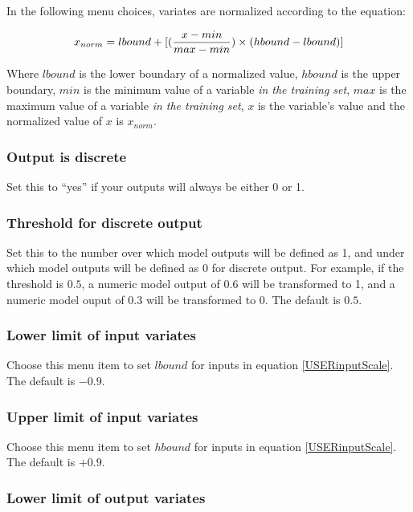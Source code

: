 In the following menu choices, variates are normalized according to
the equation:

\begin{equation}\label{USERinputScale}
x_{norm} = lbound + [({{x - min} \over {max - min}}) \times (hbound -
lbound)]
\end{equation}

Where $lbound$ is the lower boundary of a normalized value, $hbound$
is the upper boundary, $min$ is the minimum value of a variable {\em
in the training set}, $max$ is the maximum value of a variable {\em in
the training set}, $x$ is the variable's value and the normalized
value of $x$ is $x_{norm}$.

\subsubsection{Output is discrete}

Set this to ``yes'' if your outputs will always be either 0 or 1.

\subsubsection{Threshold for discrete output}

Set this to the number over which model outputs will be defined as 1,
and under which model outputs will be defined as 0 for discrete
output.  For example, if the threshold is $0.5$, a numeric model
output of $0.6$ will be transformed to 1, and a numeric model ouput of
$0.3$ will be transformed to 0.  The default is $0.5$.

\subsubsection{Lower limit of input variates}

Choose this menu item to set $lbound$ for inputs in equation
\ref{USERinputScale}.  The default is $-0.9$.

\subsubsection{Upper limit of input variates}

Choose this menu item to set $hbound$ for inputs in equation
\ref{USERinputScale}.  The default is $+0.9$.

\subsubsection{Lower limit of output variates}

